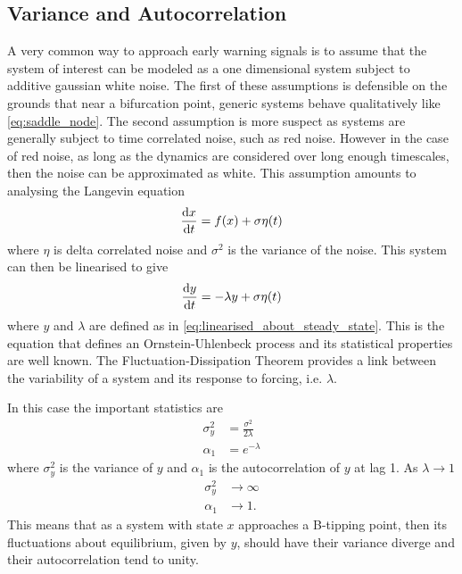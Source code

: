 \subsection{Variance and Autocorrelation}
A very common way to approach early warning signals is to assume that the system of interest can be modeled as a one dimensional system subject to additive gaussian white noise. The first
of these assumptions is defensible on the grounds that near a bifurcation point, generic systems behave qualitatively like \cref{eq:saddle_node}. The second assumption is more suspect
as systems are generally subject to time correlated noise, such as red noise. However in the case of red noise, as long as the dynamics are considered over long enough timescales, then the
noise can be approximated as white. This assumption amounts to analysing the Langevin equation \parencite{Langevin1908}
\begin{equation}
  \label{eq:stochastic_system}
  \dv{x}{t} = f(x) + \sigma \eta(t) 
\end{equation}
where $\eta$ is delta correlated noise and $\sigma^2$ is the variance of the noise. This system can then be linearised to give
\begin{equation}
  \label{eq:ou_process}
  \dv{y}{t} = -\lambda y + \sigma \eta(t)
\end{equation}
where $y$ and $\lambda$ are defined as in \cref{eq:linearised_about_steady_state}. This is the equation that defines an Ornstein-Uhlenbeck process \parencite{Uhlenbeck1930} and its statistical
properties are well known. The Fluctuation-Dissipation Theorem \parencite{Marconi2008,Kubo1966,Leith1975,Einstein1905}
provides a link between the variability of a system and its response to
forcing, i.e. $\lambda$.

In this case the important statistics are
\begin{align}
  \sigma^2_y &= \frac{\sigma^2}{2\lambda} \label{eq:y_var}\\
  \alpha_1   &= e^{-\lambda} \label{eq:y_ac}
\end{align}
where $\sigma^2_y$ is the variance of $y$ and $\alpha_1$ is the autocorrelation of $y$ at lag 1. As $\lambda \rightarrow 1$
\begin{align}
  \sigma_y^2 &\rightarrow \infty \\
  \alpha_1    &\rightarrow 1.
\end{align}
This means that as a system with state $x$ approaches a B-tipping point, then its fluctuations about equilibrium, given by $y$, should have their variance diverge and their autocorrelation
tend to unity.

